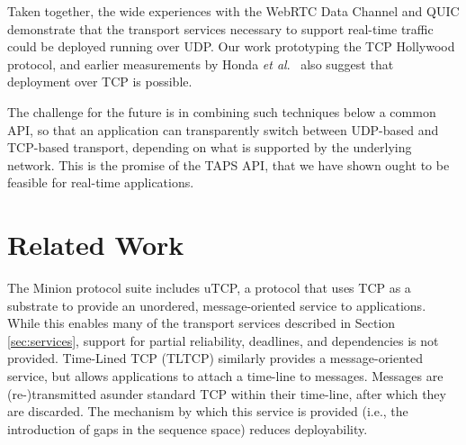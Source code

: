 \documentclass{sig-alternate-05-2015}
\begin{document}
Taken together, the wide experiences with the WebRTC Data Channel and QUIC
demonstrate that the transport services necessary to support real-time
traffic could be deployed running over UDP. Our work prototyping the TCP
Hollywood protocol, and earlier measurements by Honda \emph{et al}.\
\cite{honda:2011:extend-tcp} also suggest that deployment over TCP is
possible.

The challenge for the future is in combining such techniques below a common
API, so that an application can transparently switch between UDP-based and
TCP-based transport, depending on what is supported by the underlying
network. This is the promise of the TAPS API, that we have shown ought to
be feasible for real-time applications.

\section{Related Work}
\label{sec:related}

%
% 

The Minion protocol suite \cite{nowlan:2012:minion} includes uTCP, a
protocol that uses TCP as a substrate to provide an unordered,
message-oriented service to applications. While this enables many of
the transport services described in Section \ref{sec:services}, support for
partial reliability, deadlines, and dependencies is not provided. 
Time-Lined TCP (TLTCP) \cite{mukherjee:2000:timelines} similarly provides a
message-oriented service, but allows applications to attach a time-line
to messages. Messages are (re-)transmitted asunder standard TCP within
their time-line, after which they are discarded. The mechanism by which
this service is provided (i.e., the introduction of gaps in the sequence
space) reduces deployability.
\end{document}
